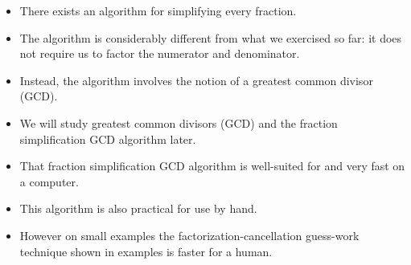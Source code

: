 \begin{frame}
\begin{itemize}
\item There exists an algorithm for simplifying every fraction. 
\item<2-> The algorithm is considerably different from what we exercised so far: it does not require us to factor the numerator and denominator.
\item<3-> Instead, the algorithm involves the notion of a greatest common divisor (GCD).
\item<4-> We will study greatest common divisors (GCD) and the fraction simplification GCD algorithm later.
\item<5-> That fraction simplification GCD algorithm is well-suited for and very fast on a computer. 
\item<6-> This algorithm is also practical for use by hand.
\item<7-> However on small examples the factorization-cancellation guess-work technique shown in examples is faster for a human.
\end{itemize}
\end{frame}